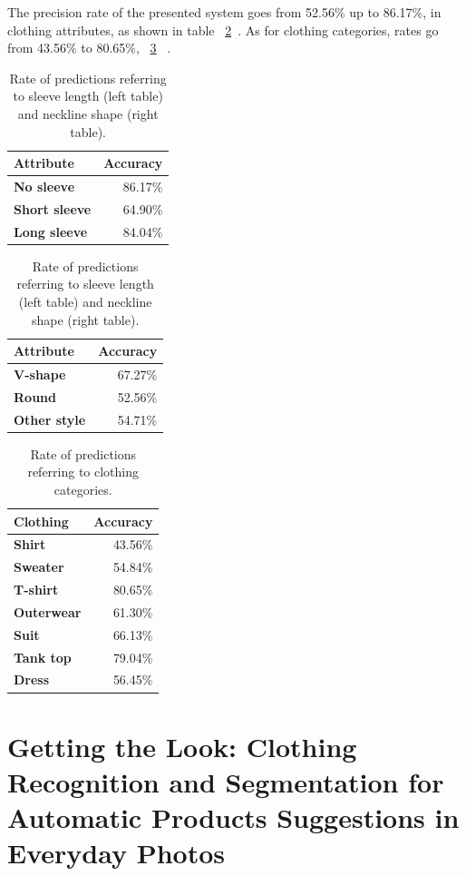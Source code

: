 \documentclass[titlepage,12pt,a4paper,times]{book}
\begin{document}
The precision rate of the presented system goes from 52.56\% up to 86.17\%,
in clothing attributes, as shown in table ~\ref{tab:ropsn}~\citep{2}. As for
clothing categories, rates go from 43.56\% to 80.65\%, ~\ref{tab:ropcc}
~\citep{2}.

\begin{table}
\centering
\begin{tabular}{|l|r|}
\hline
\textbf{Attribute} & \textbf{Accuracy}\\
\hline
\hline
\textbf{No sleeve} & 86.17\% \\
\hline
\textbf{Short sleeve} & 64.90\% \\
\hline
\textbf{Long sleeve} & 84.04\% \\
\hline
\end{tabular}
\quad
\begin{tabular}{|l|r|}
\hline
\textbf{Attribute} & \textbf{Accuracy}\\
\hline
\hline
\textbf{V-shape} & 67.27\% \\
\hline
\textbf{Round} & 52.56\% \\
\hline
\textbf{Other style} & 54.71\% \\
\hline
\end{tabular}
\caption{Rate of predictions referring to sleeve length (left table) and
neckline shape (right table).}
\label{tab:ropsn}
\end{table}
\FloatBarrier

\begin{table}
\centering
\begin{tabular}{|l|r|}
\hline
\textbf{Clothing} & \textbf{Accuracy}\\
\hline
\hline
\textbf{Shirt} & 43.56\% \\
\hline
\textbf{Sweater} & 54.84\% \\
\hline
\textbf{T-shirt} & 80.65\% \\
\hline
\textbf{Outerwear} & 61.30\% \\
\hline
\textbf{Suit} & 66.13\% \\
\hline
\textbf{Tank top} & 79.04\% \\
\hline
\textbf{Dress} & 56.45\% \\
\hline
\end{tabular}
\caption{Rate of predictions referring to clothing categories.}
\label{tab:ropcc}
\end{table}
\FloatBarrier


\section{Getting the Look: Clothing Recognition and Segmentation for Automatic
Products Suggestions in Everyday Photos}
\label{chap2:sec:art3}
\end{document}
